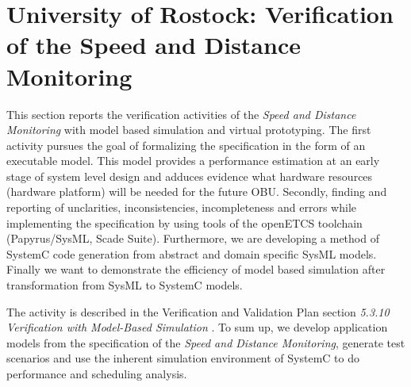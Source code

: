 %
%
%
%
%
%
%


\section{University of Rostock: Verification of the Speed and Distance
Monitoring}
\label{sec:urostock}
This section reports the verification activities of the \emph{Speed and Distance Monitoring} with model based simulation and virtual prototyping. The first activity pursues the goal of formalizing the specification in the form of an executable model. This model provides a performance estimation at an early stage of system level design and adduces evidence what hardware resources (hardware platform) will be needed for the future OBU. Secondly, finding and reporting of unclarities, inconsistencies, incompleteness and errors while implementing the specification by using tools of the openETCS toolchain (Papyrus/SysML, Scade Suite). Furthermore, we are developing a method of SystemC code generation from abstract and domain specific SysML models. Finally we want to demonstrate the efficiency of model based simulation after transformation from SysML to SystemC models.

The activity is described in the Verification and Validation Plan section {\em 5.3.10 Verification with Model-Based Simulation} \cite{D4.1_2013}. To sum up, we develop application models from the specification of the \emph{Speed and Distance Monitoring}, generate test scenarios and use the inherent simulation environment of SystemC to do performance and scheduling analysis.

